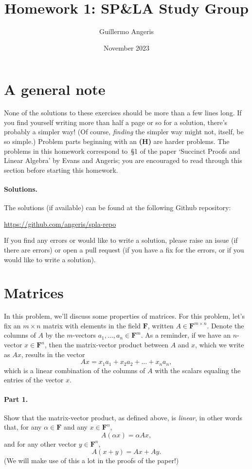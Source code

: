 \documentclass[12pt,hidelinks]{article}
\title{Homework 1: SP\&LA Study Group}
\author{Guillermo Angeris}
\date{November 2023}
\newcommand{\field}{\mathbf{F}}
\begin{document}
 
\maketitle 

\section*{A general note}

None of the solutions to these exercises should be more than a few lines long.
If you find yourself writing more than half a page or so for a solution,
there's probably a simpler way! (Of course, \emph{finding} the simpler way
might not, itself, be so simple.) Problem parts beginning with an {\bf (H)} are
harder problems. The problems in this homework correspond to~\S1 of the
paper `Succinct Proofs and Linear Algebra' by Evans and Angeris; you are
encouraged to read through this section before starting this homework.

\paragraph{Solutions.} The solutions (if available) can be found at the
following Github repository:
\begin{center}
    \url{https://github.com/angeris/spla-repo}
\end{center}
If you find any errors or would like to write a solution, please raise an issue
(if there are errors) or open a pull request (if you have a fix for the errors,
or if you would like to write a solution).

\section{Matrices}
In this problem, we'll discuss some properties of matrices. For this problem,
let's fix an $m\times n$ matrix with elements in the field $\field$, written $A
\in \field^{m\times n}$. Denote the columns of $A$ by the $m$-vectors $a_1,
\dots, a_n \in \field^m$. As a reminder, if we have an $n$-vector $x \in
\field^n$, then the matrix-vector product between $A$ and $x$, which we write
as $Ax$, results in the vector
\begin{equation}\label{eq:mat-mul}
    Ax = x_1a_1 + x_2a_2 + \dots + x_n a_n,
\end{equation}
which is a linear combination of the columns of $A$ with the scalars
equaling the entries of the vector $x$.

\paragraph{Part 1.} Show that the matrix-vector product, as defined above, is
\emph{linear}, in other words that, for any $\alpha \in \field$ and any $x \in
\field^n$,
\[
    A(\alpha x) = \alpha Ax,
\]
and for any other vector $y \in \field^n$,
\[
    A(x + y) = Ax + Ay.
\]
(We will make use of this a lot in the proofs of the paper!)
\end{document}
